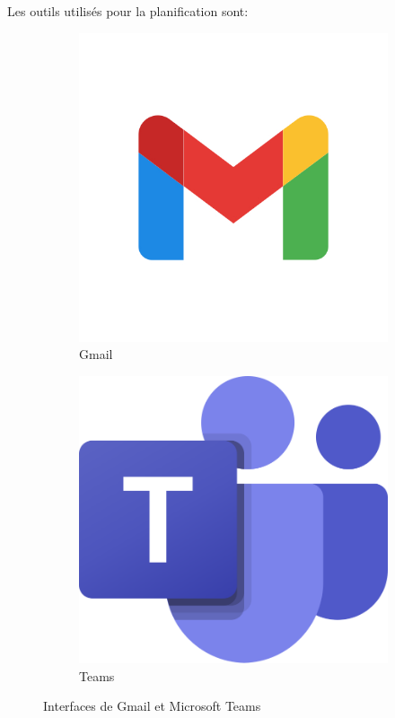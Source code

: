 \documentclass{article}
\begin{document}
\noindent Les outils utilisés pour la planification sont: 
\begin{figure}[H]
  \centering
  \begin{subfigure}[t]{0.15\textwidth}
    \centering
    \includegraphics[width=\textwidth]{Gmail.jpg}
    \caption{Gmail}
    \label{fig:gmail}
  \end{subfigure}
  \hspace{1cm}
  \begin{subfigure}[t]{0.15\textwidth}
    \centering
    \includegraphics[width=\textwidth]{teams.png}
    \caption{Teams}
    \label{fig:teams-sub}
  \end{subfigure}
  \caption{Interfaces de Gmail et Microsoft Teams}
  \label{fig:teams1}
\end{figure}
\end{document}
